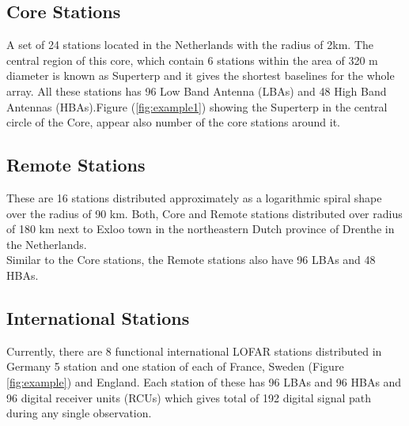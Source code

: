 \subsection*{Core Stations}
A set of 24 stations located in the Netherlands with the radius of 
2km. The central region of this core, which contain 6 stations within the area of 320 m diameter is known as Superterp and it gives the shortest baselines for the whole array. All these stations has 96 Low Band Antenna (LBAs) and 48 High Band Antennas (HBAs).Figure (\ref{fig:example1}) showing the Superterp in the central circle of the Core, appear also number of the core stations around it.
\subsection*{Remote Stations}
These are 16 stations distributed approximately as a logarithmic spiral shape over the radius of 90 km. Both, Core and Remote stations distributed over radius of 180 km next to Exloo town in the northeastern Dutch province of Drenthe in the Netherlands.\\
Similar to the Core stations, the Remote stations also have 96 LBAs and 48 HBAs.

\subsection*{International Stations}
Currently, there are 8 functional international LOFAR stations distributed in Germany 5 station and one station of each of France, Sweden (Figure \ref{fig:example}) and England. Each station of these has 96 LBAs and 96 HBAs and 96 digital receiver units (RCUs) which gives total of 192 digital signal path during any single observation.






